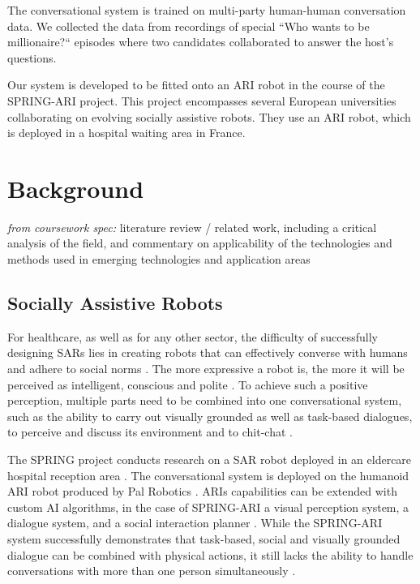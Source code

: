 \documentclass[hidelinks, 11pt]{article}
\begin{document}
The conversational system is trained on multi-party human-human conversation data. We collected the data from recordings of special “Who wants to be millionaire?“ episodes where two candidates collaborated to answer the host's questions.

Our system is developed to be fitted onto an ARI robot in the course of the SPRING-ARI project. This project encompasses several European universities collaborating on evolving socially assistive robots. They use an ARI robot, which is deployed in a hospital waiting area in France.

\section{Background}
\label{sec:background}

\textit{from coursework spec:} literature review / related work, including a critical analysis of the field, and commentary on applicability of the technologies and methods used in emerging technologies and application areas

\subsection{Socially Assistive Robots}
\label{subsec:socially_assistive_robots}
For healthcare, as well as for any other sector, the difficulty of successfully designing SARs lies in creating robots that can effectively converse with humans and adhere to social norms \cite{moujahid_multi_party_2022}. The more expressive a robot is, the more it will be perceived as intelligent, conscious and polite \cite{moujahid_multi_party_2022}. To achieve such a positive perception, multiple parts need to be combined into one conversational system, such as the ability to carry out visually grounded as well as task-based dialogues, to perceive and discuss its environment and to chit-chat \cite{gunson_visually_aware_2022}.

The SPRING project conducts research on a SAR robot deployed in an eldercare hospital reception area \cite{addlesee_comprehensive_2020}. The conversational system is deployed on the humanoid ARI robot produced by Pal Robotics \cite{palrobot}. ARIs capabilities can be extended with custom AI algorithms, in the case of SPRING-ARI a visual perception system, a dialogue system, and a social interaction planner \cite{addlesee_comprehensive_2020}. While the SPRING-ARI system successfully demonstrates that task-based, social and visually grounded dialogue can be combined with physical actions, it still lacks the ability to handle conversations with more than one person simultaneously \cite{addlesee_comprehensive_2020}.
\end{document}

